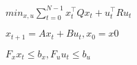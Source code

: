 \documentclass{article}
\begin{document}
$min_{x,u} \sum_{t=0}^{N-1} x_t^\top Q x_t + u_t^\top R u_t$
\pagebreak

$x_{t+1} = Ax_t + Bu_t, x_0 = x0$
\pagebreak

$F_x x_t \leq b_x, F_u u_t \leq b_u$
\pagebreak
\end{document}
